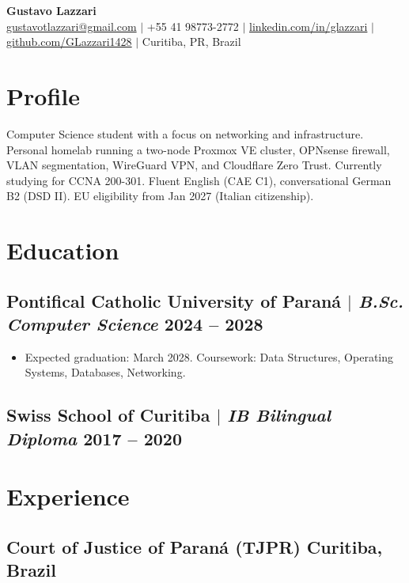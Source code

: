 \documentclass[11pt]{article}
\begin{document}
\begin{center}
    {\LARGE\bfseries Gustavo Lazzari} \\
    \vspace{2pt}
    \href{mailto:gustavotlazzari@gmail.com}{gustavotlazzari@gmail.com} $|$
    +55 41 98773-2772 $|$
    \href{https://www.linkedin.com/in/glazzari}{linkedin.com/in/glazzari} $|$
    \href{https://github.com/GLazzari1428}{github.com/GLazzari1428} $|$
    Curitiba, PR, Brazil
\end{center}

\section{Profile}
Computer Science student with a focus on networking and infrastructure. Personal homelab running a
two-node Proxmox VE cluster, OPNsense firewall, VLAN segmentation, WireGuard VPN, and Cloudflare
Zero Trust. Currently studying for CCNA 200-301. Fluent English (CAE C1), conversational German B2
(DSD II). EU eligibility from Jan 2027 (Italian citizenship).

\section{Education}
\subsection{Pontifical Catholic University of Paran\'{a} $|$ {\normalfont\itshape B.Sc. Computer Science} \hfill 2024 -- 2028}
\begin{itemize}
    \item Expected graduation: March 2028. Coursework: Data Structures, Operating Systems, Databases, Networking.
\end{itemize}
\subsection{Swiss School of Curitiba $|$ {\normalfont\itshape IB Bilingual Diploma} \hfill 2017 -- 2020}

\section{Experience}
\subsection{Court of Justice of Paran\'{a} (TJPR) \hfill Curitiba, Brazil}
\end{document}
